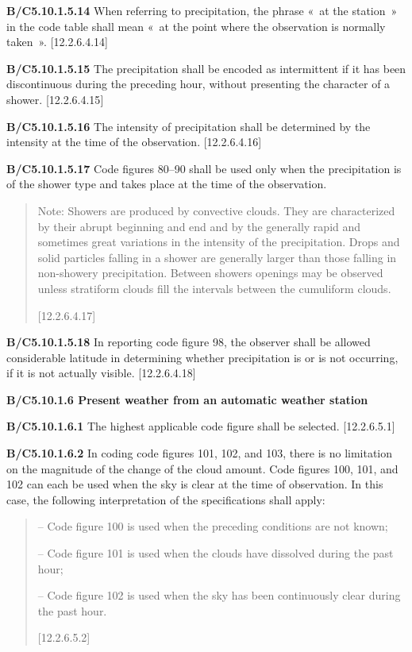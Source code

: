 \textbf{B/C5.10.1.5.14} When referring to precipitation, the phrase «~at the station~» in the code table shall mean «~at the point where the observation is normally taken~». {[}12.2.6.4.14{]}

\textbf{B/C5.10.1.5.15} The precipitation shall be encoded as intermittent if it has been discontinuous during the preceding hour, without presenting the character of a shower. {[}12.2.6.4.15{]}

\textbf{B/C5.10.1.5.16} The intensity of precipitation shall be determined by the intensity at the time of the observation. {[}12.2.6.4.16{]}

\textbf{B/C5.10.1.5.17} Code figures 80--90 shall be used only when the precipitation is of the shower type and takes place at the time of the observation.

\begin{quote}
Note: Showers are produced by convective clouds. They are characterized by their abrupt beginning and end and by the generally rapid and sometimes great variations in the intensity of the precipitation. Drops and solid particles falling in a shower are generally larger than those falling in non-showery precipitation. Between showers openings may be observed unless stratiform clouds fill the intervals between the cumuliform clouds.

{[}12.2.6.4.17{]}
\end{quote}

\textbf{B/C5.10.1.5.18} In reporting code figure 98, the observer shall be allowed considerable latitude in determining whether precipitation is or is not occurring, if it is not actually visible. {[}12.2.6.4.18{]}

\textbf{B/C5.10.1.6 Present weather from an automatic weather station}

\textbf{B/C5.10.1.6.1} The highest applicable code figure shall be selected. {[}12.2.6.5.1{]}

\textbf{B/C5.10.1.6.2} In coding code figures 101, 102, and 103, there is no limitation on the magnitude of the change of the cloud amount. Code figures 100, 101, and 102 can each be used when the sky is clear at the time of observation. In this case, the following interpretation of the specifications shall apply:

\begin{quote}
-- Code figure 100 is used when the preceding conditions are not known;

-- Code figure 101 is used when the clouds have dissolved during the past hour;

-- Code figure 102 is used when the sky has been continuously clear during the past hour.

{[}12.2.6.5.2{]}
\end{quote}

